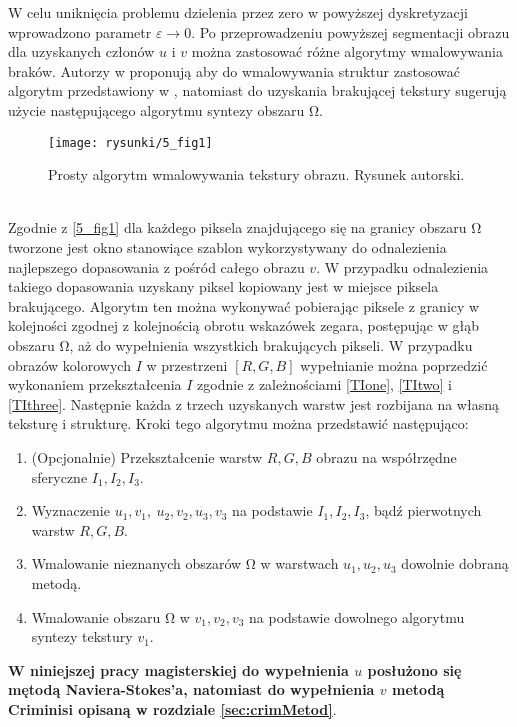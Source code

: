 \documentclass[12pt, twoside, openany]{report}
\theoremstyle{definition}
\begin{document}
W celu uniknięcia problemu dzielenia przez zero w powyższej dyskretyzacji wprowadzono parametr $\varepsilon \rightarrow 0$. 
Po przeprowadzeniu powyższej segmentacji obrazu dla uzyskanych członów $u$ i $v$ można zastosować różne algorytmy wmalowywania braków. Autorzy w \cite{NavierStokesAndTexturePropagation} proponują aby do wmalowywania struktur zastosować algorytm przedstawiony w \cite{bertalmio2000image}, natomiast do uzyskania brakującej tekstury sugerują użycie następującego algorytmu syntezy obszaru $\mathrm{\Omega }$.
\begin{figure}[!h]
	\centering
	\texttt{[image: rysunki/5\_fig1]}
	\caption{Prosty algorytm wmalowywania tekstury obrazu. Rysunek autorski.}
	\label{5_fig1}
\end{figure} \\
Zgodnie z \autoref{5_fig1} dla każdego piksela znajdującego się na granicy obszaru $\mathrm{\Omega }$ tworzone jest okno stanowiące szablon wykorzystywany do odnalezienia najlepszego dopasowania z pośród całego obrazu $v$. W przypadku odnalezienia takiego dopasowania uzyskany piksel kopiowany jest w miejsce piksela brakującego. Algorytm ten można wykonywać pobierając piksele z granicy w kolejności zgodnej z kolejnością obrotu wskazówek zegara, postępując w głąb obszaru $\mathrm{\Omega }$, aż do wypełnienia wszystkich brakujących pikseli. 
W przypadku obrazów kolorowych $I$ w przestrzeni $[R, G, B]$ wypełnianie można poprzedzić wykonaniem przekształcenia $I$ zgodnie z zależnościami \eqref{TIone}, \eqref{TItwo} i \eqref{TIthree}. Następnie każda z trzech uzyskanych warstw jest rozbijana na własną teksturę i strukturę. Kroki tego  algorytmu można przedstawić następująco:
\begin{enumerate}
\item
(Opcjonalnie) Przekształcenie warstw $R,G,B$ obrazu na współrzędne sferyczne $I_1,I_2,I_3$.
\item
Wyznaczenie $u_1,v_1,\ u_2,v_2,u_3,v_3$ na podstawie $I_1, I_2, I_3$, bądź pierwotnych warstw $R, G, B$.
\item
Wmalowanie nieznanych obszarów $\mathrm{\Omega }$ w warstwach $u_1,u_2,u_3$ dowolnie dobraną metodą.
\item
Wmalowanie obszaru $\mathrm{\Omega }$ w $v_1,v_2,v_3$ na podstawie dowolnego algorytmu syntezy tekstury $v_1$.
\end{enumerate}
\textbf{W niniejszej pracy magisterskiej do wypełnienia $u$ posłużono się mętodą Naviera-Stokes'a, natomiast do wypełnienia $v$ metodą Criminisi opisaną w rozdziale \ref{sec:crimMetod}}.
\end{document}
